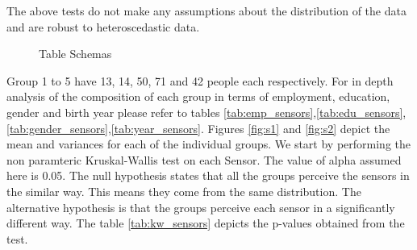 The above tests do not make any assumptions about the distribution of the data and are robust to heteroscedastic data.
\begin{figure}[htp]
\caption{Table Schemas}
\label{fig:s3}
\end{figure}

Group 1 to 5 have 13, 14, 50, 71 and 42 people each respectively. For in depth analysis of the composition of each group in terms of employment, education, gender and birth year please refer to tables
\ref{tab:emp_sensors},\ref{tab:edu_sensors},\ref{tab:gender_sensors},\ref{tab:year_sensors}. Figures \ref{fig:s1} and \ref{fig:s2} depict the mean and variances for each of the individual groups. We start by performing the non paramteric Kruskal-Wallis test on each Sensor. The value of alpha assumed here is 0.05. The null hypothesis states that all the groups perceive the sensors in the similar way. This means they come from the same distribution. The alternative hypothesis is
that the groups perceive each sensor in a significantly different way. The table \ref{tab:kw_sensors} depicts the p-values obtained from the test.


